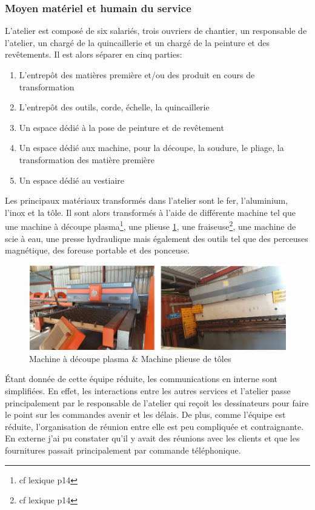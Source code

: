 \subsubsection{Moyen matériel et humain du service}%
L'atelier est composé de six salariés, trois ouvriers de chantier, un responsable de l'atelier, un chargé de la quincaillerie et un chargé de la peinture et des revêtements. Il est alors séparer en cinq parties:
\begin{enumerate}
    \item L'entrepôt des matières première et/ou des produit en cours de transformation
    \item L'entrepôt des outils, corde, échelle, la quincaillerie
    \item Un espace dédié à la pose de peinture et de revêtement
    \item Un espace dédié aux machine, pour la découpe, la soudure, le pliage, la transformation des matière première
    \item Un espace dédié au vestiaire
\end{enumerate}
Les principaux matériaux transformés dans l'atelier sont le fer, l'aluminium, l'inox et la tôle. Il sont alors transformés à l'aide de différente machine tel que une machine à découpe plasma\footnote{cf lexique p14}, une plieuse \ref{fig:plasma_plie}, une fraiseuse\footnote{cf lexique p14}, une machine de scie à eau, une presse hydraulique mais également des outils tel que des perceuses magnétique, des foreuse portable et des ponceuse.
\begin{figure}[h!]
    \centering
    \includegraphics[width=1\linewidth]{figures/plasma_plie.png}
    \caption{Machine à découpe plasma \& Machine plieuse de tôles}
    \label{fig:plasma_plie}
\end{figure} \newpage
Étant donnée de cette équipe réduite, les communications en interne sont simplifiées. En effet, les interactions entre les autres services et l'atelier passe principalement par le responsable de l'atelier qui reçoit les dessinateurs pour faire le point sur les commandes avenir et les délais. De plus, comme l'équipe est réduite, l'organisation de réunion entre elle est peu compliquée et contraignante.\newline
En externe j'ai pu constater qu'il y avait des réunions avec les clients et que les fournitures passait principalement par commande téléphonique.\par

